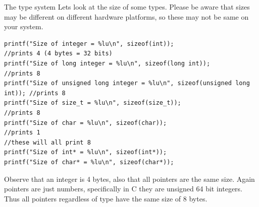 \documentclass{beamer}
\begin{document}
\begin{frame}[fragile]{The type system}
Lets look at the size of some types. Please be aware that sizes may be different on different hardware platforms, so these may not be same on your system.

\begin{verbatim}
printf("Size of integer = %lu\n", sizeof(int));                             //prints 4 (4 bytes = 32 bits)
printf("Size of long integer = %lu\n", sizeof(long int));                   //prints 8
printf("Size of unsigned long integer = %lu\n", sizeof(unsigned long int)); //prints 8
printf("Size of size_t = %lu\n", sizeof(size_t));                           //prints 8
printf("Size of char = %lu\n", sizeof(char));                               //prints 1
//these will all print 8
printf("Size of int* = %lu\n", sizeof(int*));
printf("Size of char* = %lu\n", sizeof(char*));
\end{verbatim}
Observe that an integer is 4 bytes, also that all pointers are the same size. Again pointers are just numbers, specifically in C they are unsigned 64 bit integers. Thus all pointers regardless of type have the same size of 8 bytes.
\end{frame}
\end{document}
